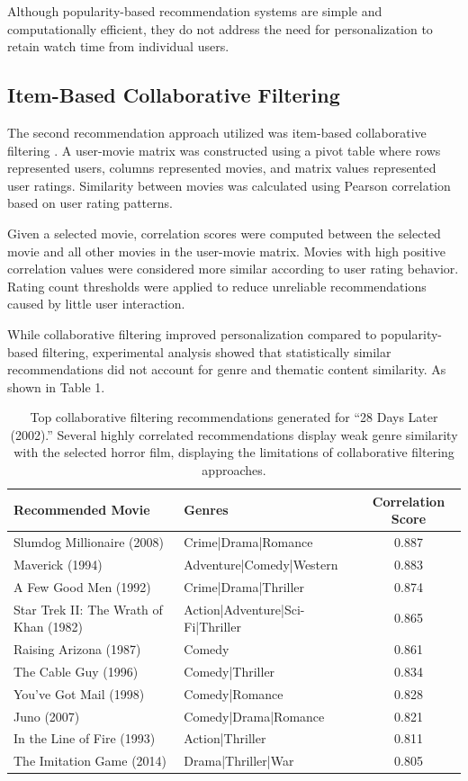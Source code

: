 \documentclass{article}
\begin{document}
Although popularity-based recommendation systems are simple and computationally efficient, they do not address the need for personalization to retain watch time from individual users.

\subsection{Item-Based Collaborative Filtering}

The second recommendation approach utilized was item-based collaborative filtering \cite{sarwar2001itembased}. A user-movie matrix was constructed using a pivot table where rows represented users, columns represented movies, and matrix values represented user ratings. Similarity between movies was calculated using Pearson correlation based on user rating patterns.

Given a selected movie, correlation scores were computed between the selected movie and all other movies in the user-movie matrix. Movies with high positive correlation values were considered more similar according to user rating behavior. Rating count thresholds were applied to reduce unreliable recommendations caused by little user interaction.

While collaborative filtering improved personalization compared to popularity-based filtering, experimental analysis showed that statistically similar recommendations did not account for genre and thematic content similarity. As shown in Table 1.
\begin{table}[ht]
\centering
\small
\begin{tabular}{|p{4.2cm}|p{4.5cm}|c|}
\hline
\textbf{Recommended Movie} & \textbf{Genres} & \textbf{Correlation Score} \\
\hline
Slumdog Millionaire (2008) & Crime|Drama|Romance & 0.887 \\
\hline
Maverick (1994) & Adventure|Comedy|Western & 0.883 \\
\hline
A Few Good Men (1992) & Crime|Drama|Thriller & 0.874 \\
\hline
Star Trek II: The Wrath of Khan (1982) & Action|Adventure|Sci-Fi|Thriller & 0.865 \\
\hline
Raising Arizona (1987) & Comedy & 0.861 \\
\hline
The Cable Guy (1996) & Comedy|Thriller & 0.834 \\
\hline
You've Got Mail (1998) & Comedy|Romance & 0.828 \\
\hline
Juno (2007) & Comedy|Drama|Romance & 0.821 \\
\hline
In the Line of Fire (1993) & Action|Thriller & 0.811 \\
\hline
The Imitation Game (2014) & Drama|Thriller|War & 0.805 \\
\hline
\end{tabular}
\caption{Top collaborative filtering recommendations generated for ``28 Days Later (2002).'' Several highly correlated recommendations display weak genre similarity with the selected horror film, displaying the limitations of collaborative filtering approaches.}
\label{tab:collaborative_filtering_results}
\end{table}
\end{document}
